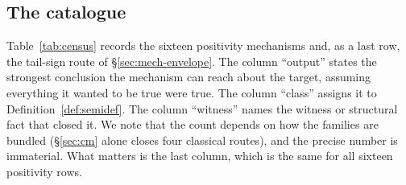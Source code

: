 \documentclass[11pt]{amsart}
\theoremstyle{definition}
\theoremstyle{remark}
\theoremstyle{definition}
\begin{document}
\subsection{The catalogue}

Table~\ref{tab:census} records the sixteen positivity mechanisms and, as a last row, the tail-sign
route of \S\ref{sec:mech-envelope}. The column ``output'' states the strongest
conclusion the mechanism can reach about the target, assuming everything it wanted to be true were
true. The column ``class'' assigns it to Definition~\ref{def:semidef}. The column ``witness''
names the witness or structural fact that closed it. We note that the count depends on
how the families are bundled (\S\ref{sec:cm} alone closes four classical routes), and the precise
number is immaterial. What matters is the last column, which is the same for all sixteen positivity rows.
\end{document}
